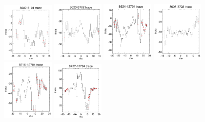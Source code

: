 \documentclass[fleqn,usenatbib]{mnras}
\begin{document}
\begin{figure}
    \includegraphics[width=0.23\textwidth]{Images/SN1-MC250/CPSB-CTRLs/8602-6101-1-250.png}
    \includegraphics[width=0.23\textwidth]{Images/SN1-MC250/CPSB-CTRLs/8623-3702-1-250.png}
    \includegraphics[width=0.23\textwidth]{Images/SN1-MC250/CPSB-CTRLs/8624-12704-1-250.png}
    \includegraphics[width=0.23\textwidth]{Images/SN1-MC250/CPSB-CTRLs/8625-3703-1-250.png}
    \includegraphics[width=0.23\textwidth]{Images/SN1-MC250/CPSB-CTRLs/8716-12704-1-250.png}
    \includegraphics[width=0.23\textwidth]{Images/SN1-MC250/CPSB-CTRLs/8727-12704-1-250.png}

\end{figure}
\end{document}
